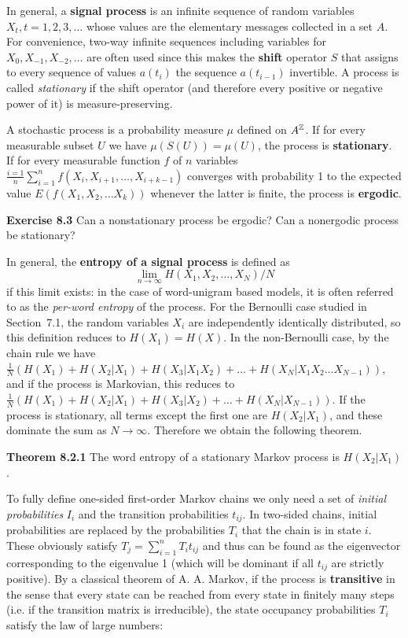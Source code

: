 In general, a {\bf signal process} is an infinite sequence of random variables
$X_t, t=1,2,3,\ldots$ whose values are the elementary messages collected in a
set $A$. For convenience, two-way infinite sequences including variables for
$X_0, X_{-1}, X_{-2}, \ldots$ are often used since this makes the {\bf shift}
operator $S$ that assigns to every sequence of values $a(t_i)$ the sequence
$a(t_{i-1})$ invertible. A process is called {\it stationary} if the shift
operator (and therefore every positive or negative power of it) is
measure-preserving.

\smallskip{} A stochastic process is a
probability measure $\mu$ defined on $A^{ \Bbb Z}$. If for every measurable
subset $U$ we have $\mu(S(U)) = \mu(U)$, the process is {\bf stationary}. If
for every measurable function $f$ of $n$ variables $\frac{i=1}{n}
\sum_{i=1}^{n} f(X_i,X_{i+1},\ldots,X_{i+k-1})$ converges with probability 1
to the expected value $E(f(X_1,X_2,\ldots X_k))$ whenever the latter is
finite, the process is {\bf ergodic}.  
 

\smallskip\noindent
{\bf Exercise 8.3} Can a nonstationary process be ergodic? Can a 
nonergodic process be stationary? 

\smallskip\noindent In general, the {\bf entropy of a signal process} is
defined as $$\lim_{n\rightarrow\infty} H(X_1,X_2,\ldots,X_N)/N$$ if this limit
exists: in the case of word-unigram based models, it is often referred to as
the {\it per-word entropy} of the process.  For the Bernoulli case studied in
Section~7.1, the random variables $X_i$ are independently identically
distributed, so this definition reduces to $H(X_1)=H(X)$. In the non-Bernoulli
case, by the chain rule we have $\frac{1}{N}(H(X_1)+H(X_2|X_1)+
H(X_3|X_1X_2)+\ldots +H(X_N|X_1X_2\ldots X_{N-1}))$, and if the process is
Markovian, this reduces to $\frac{1}{N}(H(X_1)+H(X_2|X_1)+H(X_3|X_2)+\ldots +
H(X_N|X_{N-1}))$. If the process is stationary, all terms except the first one
are $H(X_2|X_1)$, and these dominate the sum as
$N\rightarrow\infty$. Therefore we obtain the following theorem. 

\smallskip\noindent 
{\bf Theorem 8.2.1} The word entropy of a stationary Markov process is
$H(X_2|X_1)$.

\smallskip\noindent To fully define one-sided first-order Markov chains we
only need a set of {\it initial probabilities} $I_i$ and the transition
probabilities $t_{ij}$. In two-sided chains, initial probabilities are
replaced by the probabilities $T_i$ that the chain is in state $i$. These
obviously satisfy $T_j=\sum_{i=1}^n T_it_{ij}$ and thus can be found as the
eigenvector corresponding to the eigenvalue 1 (which will be dominant if all
$t_{ij}$ are strictly positive). By a classical theorem of A. A. Markov, if
the process is {\bf transitive} in the sense that every state can be reached
from every state in finitely many steps (i.e. if the transition matrix is
irreducible), the state occupancy probabilities $T_i$ satisfy the law of large
numbers: 

